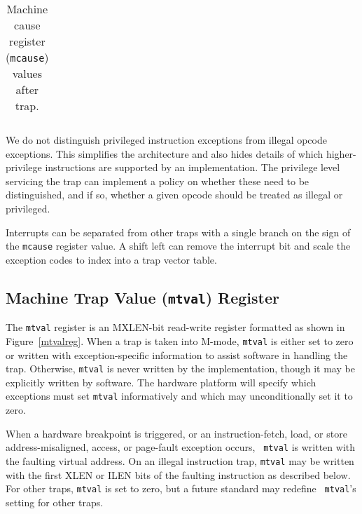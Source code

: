 \begin{table*}[h!]
\begin{center}
\begin{tabular}{|r|r|l|l|}
\end{tabular}
\end{center}
\caption{Machine cause register ({\tt mcause}) values after trap.}
\label{mcauses}
\end{table*}

\begin{commentary}
We do not distinguish privileged instruction exceptions from illegal
opcode exceptions.  This simplifies the architecture and also hides
details of which higher-privilege instructions are supported by an
implementation.  The privilege level servicing the trap can implement
a policy on whether these need to be distinguished, and if so, whether
a given opcode should be treated as illegal or privileged.
\end{commentary}

\begin{commentary}
Interrupts can be separated from other traps with a single branch on the sign of
the {\tt mcause} register value.  A shift left can remove the
interrupt bit and scale the exception codes to index into a trap
vector table.
\end{commentary}

\subsection{Machine Trap Value ({\tt mtval}) Register}

The {\tt mtval} register is an MXLEN-bit read-write register formatted as shown
in Figure~\ref{mtvalreg}.  When a trap is taken into M-mode, {\tt mtval} is
either set to zero or written with exception-specific information to assist
software in handling the trap.  Otherwise, {\tt mtval} is never written by the
implementation, though it may be explicitly written by software.  The hardware
platform will specify which exceptions must set {\tt mtval} informatively and
which may unconditionally set it to zero.

When a hardware breakpoint is triggered, or an instruction-fetch, load, or
store address-misaligned, access, or page-fault exception occurs, {\tt
  mtval} is written with the faulting virtual address.  On an illegal
instruction trap, {\tt mtval} may be written with the first XLEN or ILEN
bits of the faulting instruction as described below.  For other traps,
{\tt mtval} is set to zero, but a future standard may redefine {\tt
  mtval}'s setting for other traps.


